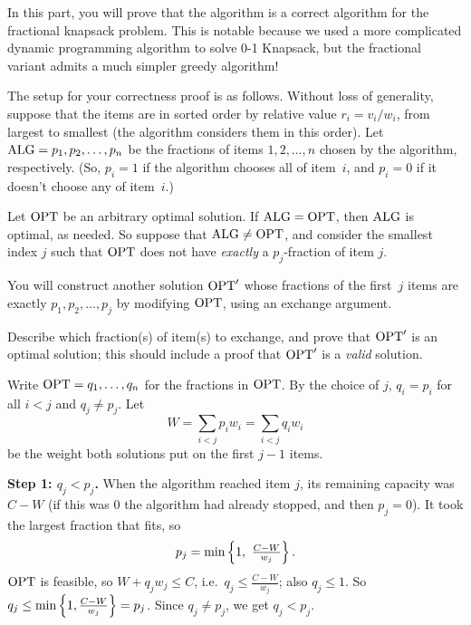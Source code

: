 \documentclass[11pt,addpoints,answers]{exam}
\begin{document}
\begin{questions}
\begin{parts}
    In this part, you will prove that the  algorithm is a correct algorithm for the fractional knapsack problem.
    This is notable because we used a more complicated dynamic programming algorithm to solve 0-1 Knapsack, but the fractional variant admits a much simpler greedy algorithm!

    The setup for your correctness proof is as follows.
    Without loss of generality, suppose that the items are in sorted order by relative value $r_{i}=v_{i}/w_{i}$, from largest to smallest (the algorithm considers them in this order).
    Let $\mathrm{ALG}=p_1,p_2,\dots,p_n$ be the fractions of items $1,2,\dots, n$ chosen by the algorithm, respectively.
    (So, $p_i=1$ if the algorithm chooses all of item~$i$, and $p_i=0$ if it doesn't choose any of item~$i$.)

    Let $\mathrm{OPT}$ be an arbitrary optimal solution.
    If $\mathrm{ALG} = \mathrm{OPT}$, then $\mathrm{ALG}$ is optimal, as needed.
    So suppose that $\mathrm{ALG} \neq \mathrm{OPT}$, and consider the smallest index $j$ such that $\mathrm{OPT}$ does not have \emph{exactly} a $p_j$-fraction of item $j$.

    You will construct another solution $\mathrm{OPT}'$ whose fractions of the first~$j$ items are exactly $p_1,p_2,\ldots,p_j$ by modifying $\mathrm{OPT}$, using an exchange argument.

    Describe which fraction(s) of item(s) to exchange, and prove that $\mathrm{OPT}'$ is an optimal solution; this should include a proof that $\mathrm{OPT}'$ is a \emph{valid} solution.

    \begin{solution}
      Write $\mathrm{OPT} = q_1,\dots,q_n$ for the fractions in $\mathrm{OPT}$.
      By the choice of $j$, $q_i = p_i$ for all $i < j$ and $q_j \ne p_j$.
      Let
      \[
        W = \sum_{i<j} p_i w_i = \sum_{i<j} q_i w_i
      \]
      be the weight both solutions put on the first $j-1$ items.

      \textbf{Step 1: $q_j < p_j$.}
      When the algorithm reached item $j$, its remaining capacity was $C - W$ (if this was $0$ the algorithm had already stopped, and then $p_j = 0$).
      It took the largest fraction that fits, so
      \[
        p_j = \min\left\{1,\ \tfrac{C-W}{w_j}\right\}.
      \]
      $\mathrm{OPT}$ is feasible, so $W + q_j w_j \le C$, i.e.\ $q_j \le \frac{C-W}{w_j}$; also $q_j \le 1$.
      So $q_j \le \min\left\{1, \frac{C-W}{w_j}\right\} = p_j$.
      Since $q_j \ne p_j$, we get $q_j < p_j$.


\end{solution}
\end{parts}
\end{questions}
\end{document}
